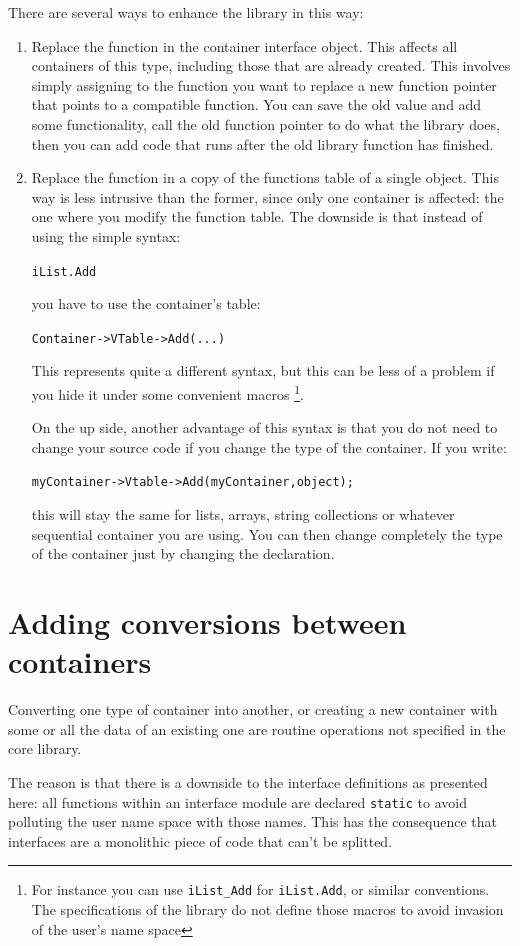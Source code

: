 \documentclass[12pt,a4paper]{memoir} %
\begin{document}
{{There are several ways to enhance the library in this way:
\begin{enumerate}
\item Replace the function in the container interface object. This affects all containers of this type, including those that are already created. This involves simply assigning to the function you want to replace a new function pointer that points to a compatible function. You can save the old value and add some functionality, call the old function pointer to do what the library does, then you can add code that runs after the old library function has finished.
\item Replace the function in a copy of the functions table of a single object. This way is less intrusive than the former, since only one container is affected: the one where you modify the function table. The downside is that instead of using the simple syntax:\par\noindent \texttt{iList.Add} \par you have to use the container's table:\par \texttt{Container->VTable->Add(...)} \par This represents quite a different syntax, but this can be less of a problem if you hide it under some convenient macros \footnote{For instance you can use \texttt{iList\_Add} for \texttt{iList.Add}, or similar conventions. The specifications of the library do not define those macros to avoid invasion of the user's name space}.

On the up side, another advantage of this syntax is that you do not need to change your source code if you change the type of the container. If you write: \par \noindent \texttt{myContainer->Vtable->Add(myContainer,object);}\par \noindent this will stay the same for lists, arrays, string collections or whatever sequential container you are using. You can then change completely the type of the container just by changing the declaration.
\end{enumerate}
\section{Adding conversions between containers}
Converting one type of container into another, or creating a new container with some or all the data of an existing one are routine operations not
specified in the core library.

The reason is that there is a downside to the interface definitions as presented here: all functions within an interface module are declared 
\verb,static, to avoid polluting the user name space with those names. This has the consequence that interfaces are a monolithic  piece of
code that can't be splitted.

}}
\end{document}
